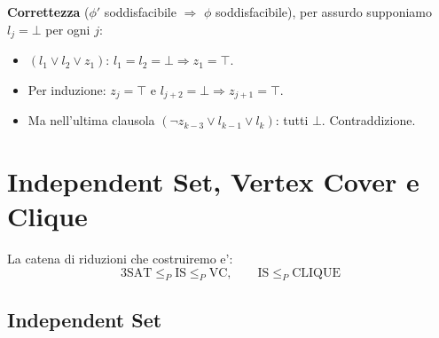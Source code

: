 {  \textbf{Correttezza} ($\phi'$ soddisfacibile $\Rightarrow$ $\phi$ soddisfacibile),
  per assurdo supponiamo $l_j = \bot$ per ogni $j$:
  \begin{itemize}
    \item $(l_1 \vee l_2 \vee z_1)$: $l_1 = l_2 = \bot \Rightarrow z_1 = \top$.
    \item Per induzione: $z_j = \top$ e $l_{j+2} = \bot \Rightarrow z_{j+1} = \top$.
    \item Ma nell'ultima clausola $(\neg z_{k-3} \vee l_{k-1} \vee l_k)$: tutti $\bot$. Contraddizione.
  \end{itemize}
}

\section{Independent Set, Vertex Cover e Clique}

La catena di riduzioni che costruiremo e':
\[
  \text{3SAT} \leq_P \text{IS} \leq_P \text{VC}, \qquad \text{IS} \leq_P \text{CLIQUE}
\]

\subsection{Independent Set}


